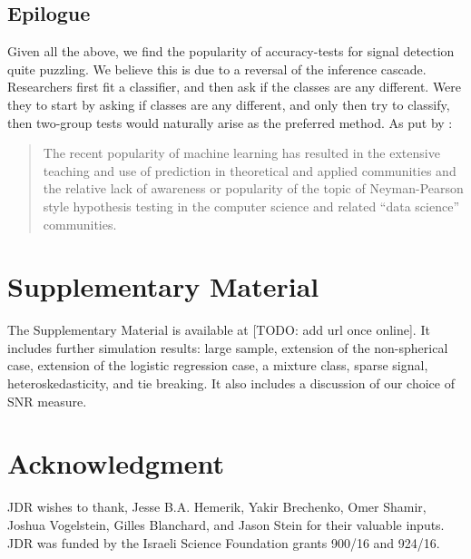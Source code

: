\documentclass[]{bio}
\begin{document}
\subsection{Epilogue}
Given all the above, we find the popularity of accuracy-tests for signal detection quite puzzling. 
We believe this is due to a reversal of the inference cascade. 
Researchers first fit a classifier, and then ask if the classes are any different.
Were they to start by asking if classes are any different, and only then try to classify, then two-group tests would naturally arise as the preferred method. 
As put by \cite{ramdas_classification_2016}:
\begin{quote}
	The recent popularity of machine learning has resulted in the extensive teaching and use
	of prediction in theoretical and applied communities and the relative lack of awareness or
	popularity of the topic of Neyman-Pearson style hypothesis testing in the computer science
	and related ``data science'' communities.
\end{quote}


\section{Supplementary Material}
The Supplementary Material is available at [TODO: add url once online]. 
It includes further simulation results: large sample, extension of the non-spherical case, extension of the logistic regression case, a mixture class, sparse signal, heteroskedasticity, and tie breaking. 
It also includes a discussion of our choice of SNR measure.



\section*{Acknowledgment}
JDR wishes to thank, Jesse B.A. Hemerik, Yakir Brechenko, Omer Shamir, Joshua Vogelstein, Gilles Blanchard, and Jason Stein for their valuable inputs. 
JDR was funded by the Israeli Science Foundation grants 900/16 and 924/16. 


\newpage


\end{document}
